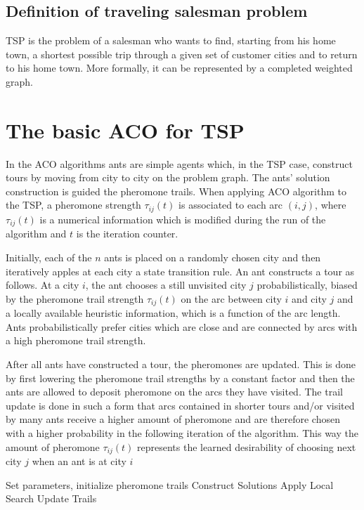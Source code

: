\documentclass[12pt]{article}
\begin{document}
\subsection{Definition of traveling salesman problem}
TSP is the problem of a salesman who wants to find, starting from his home town, a shortest possible trip through a given set of customer cities and to return to his home town. More formally, it can be represented by a completed weighted graph.
\section{The basic ACO for TSP}
In the ACO algorithms ants are simple agents which, in the TSP case, construct tours by moving from city to city on the problem graph. The ants' solution construction is guided the pheromone trails. When applying ACO algorithm to the TSP, a pheromone strength \(\tau_{ij} (t)\) is associated to each arc  \(\left(i,j\right)\), where \(\tau_{ij}(t)\) is a numerical information which is modified during the run of the algorithm and \(t\) is the iteration counter.

Initially, each of the \(n\) ants is placed on a randomly chosen city and then iteratively apples at each city a state transition rule. An ant constructs a tour as follows. At a city \(i\), the ant chooses a still unvisited city \(j\) probabilistically, biased by the pheromone trail strength \(\tau_{ij}(t)\) on the arc between city \(i\) and city \(j\) and a locally available heuristic information, which is a function of the arc length. Ants probabilistically prefer cities which are close and are connected by arcs with a high pheromone trail strength.

After all ants have constructed a tour, the pheromones are updated. This is done by first lowering the pheromone trail strengths by a constant factor and then the ants are allowed to deposit pheromone on the arcs they have visited. The trail update is done in such a form that arcs contained in shorter tours and/or visited by many ants receive a higher amount of pheromone and are therefore chosen with a higher probability in the following iteration of the algorithm. This way the amount of pheromone \(\tau_{ij}(t)\) represents the learned desirability of choosing next city \(j\) when an ant is at city \(i\)
\begin{algorithmic}[1]
    \State Set parameters, initialize pheromone trails
    \State Construct Solutions
    \State Apply Local Search 
    \State Update Trails
    \EndWhile
    \EndProcedure
\end{algorithmic}
\end{document}
